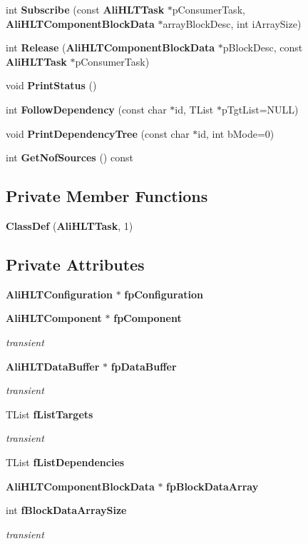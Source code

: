 \begin{CompactItemize}
\item 
int {\bf Subscribe} (const {\bf Ali\-HLTTask} $\ast$p\-Consumer\-Task, {\bf Ali\-HLTComponent\-Block\-Data} $\ast$array\-Block\-Desc, int i\-Array\-Size)
\item 
int {\bf Release} ({\bf Ali\-HLTComponent\-Block\-Data} $\ast$p\-Block\-Desc, const {\bf Ali\-HLTTask} $\ast$p\-Consumer\-Task)
\item 
void {\bf Print\-Status} ()
\item 
int {\bf Follow\-Dependency} (const char $\ast$id, TList $\ast$p\-Tgt\-List=NULL)
\item 
void {\bf Print\-Dependency\-Tree} (const char $\ast$id, int b\-Mode=0)
\item 
int {\bf Get\-Nof\-Sources} () const 
\end{CompactItemize}
\subsection*{Private Member Functions}
\begin{CompactItemize}
\item 
{\bf Class\-Def} ({\bf Ali\-HLTTask}, 1)
\end{CompactItemize}
\subsection*{Private Attributes}
\begin{CompactItemize}
\item 
{\bf Ali\-HLTConfiguration} $\ast$ {\bf fp\-Configuration}
\item 
{\bf Ali\-HLTComponent} $\ast$ {\bf fp\-Component}
\begin{CompactList}\small\item\em transient \item\end{CompactList}\item 
{\bf Ali\-HLTData\-Buffer} $\ast$ {\bf fp\-Data\-Buffer}
\begin{CompactList}\small\item\em transient \item\end{CompactList}\item 
TList {\bf f\-List\-Targets}
\begin{CompactList}\small\item\em transient \item\end{CompactList}\item 
TList {\bf f\-List\-Dependencies}
\item 
{\bf Ali\-HLTComponent\-Block\-Data} $\ast$ {\bf fp\-Block\-Data\-Array}
\item 
int {\bf f\-Block\-Data\-Array\-Size}
\begin{CompactList}\small\item\em transient \item\end{CompactList}\end{CompactItemize}


